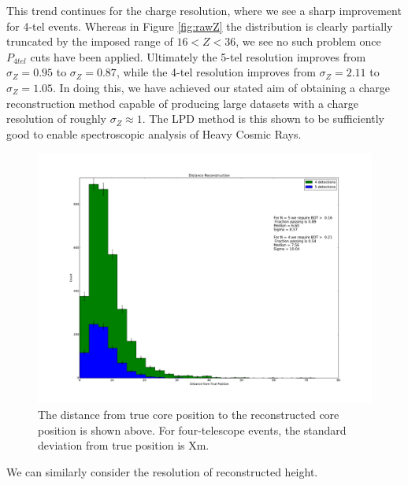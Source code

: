 \documentclass[11pt]{article}
\begin{document}
This trend continues for the charge resolution, where we see a sharp improvement for 4-tel events. Whereas in Figure \ref{fig:rawZ} the distribution is clearly partially truncated by the imposed range of $16 < Z < 36$, we see no such problem once $P_{4tel}$ cuts have been applied. Ultimately the 5-tel resolution improves from $\sigma_{Z}=0.95$ to $\sigma_{Z}=0.87$, while the 4-tel resolution improves from $\sigma_{Z}=2.11$ to $\sigma_{Z}=1.05$. In doing this, we have achieved our stated aim of obtaining a charge reconstruction method capable of producing large datasets with a charge resolution of roughly  $\sigma_{Z} \approx 1$. The LPD method is this shown to be sufficiently good to enable spectroscopic analysis of Heavy Cosmic Rays.

\begin{figure}
\begin{center}
\includegraphics[width=\textwidth]{position}
\caption{The distance from true core position to the reconstructed core position is shown above. For four-telescope events, the standard deviation from true position is Xm.}
\label{fig:position}
\end{center}
\end{figure}

We can similarly consider the resolution of reconstructed height.
\end{document}

